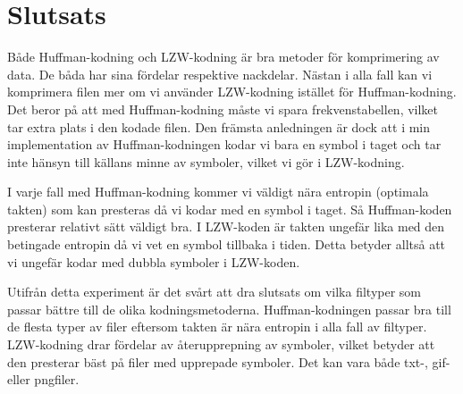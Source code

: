 
\chapter{Slutsats}
\label{cha:conclusion}

Både Huffman-kodning och LZW-kodning är bra metoder för komprimering av data. De båda har sina fördelar respektive nackdelar. Nästan i alla fall kan vi komprimera filen mer om vi använder LZW-kodning istället för Huffman-kodning. Det beror på att med Huffman-kodning måste vi spara frekvenstabellen, vilket tar extra plats i den kodade filen. Den främsta anledningen är dock att i min implementation av Huffman-kodningen kodar vi bara en symbol i taget och tar inte hänsyn till källans minne av symboler, vilket vi gör i LZW-kodning.

I varje fall med Huffman-kodning kommer vi väldigt nära entropin (optimala takten) som kan presteras då vi kodar med en symbol i taget. Så Huffman-koden presterar relativt sätt väldigt bra. I LZW-koden är takten ungefär lika med den betingade entropin då vi vet en symbol tillbaka i tiden. Detta betyder alltså att vi ungefär kodar med dubbla symboler i LZW-koden.

Utifrån detta experiment är det svårt att dra slutsats om vilka filtyper som passar bättre till de olika kodningsmetoderna. Huffman-kodningen passar bra till de flesta typer av filer eftersom takten är nära entropin i alla fall av filtyper. LZW-kodning drar fördelar av återupprepning av symboler, vilket betyder att den presterar bäst på filer med upprepade symboler. Det kan vara både txt-, gif- eller pngfiler.


